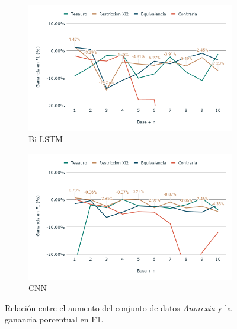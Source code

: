 \begin{figure}[hbt!]
    \begin{subfigure}[b]{0.5\textwidth}
        \includegraphics[width=\textwidth]{sections/figures/bi_LSTMAnox.png}
        \caption{Bi-LSTM}
    \end{subfigure}
    \hfill
    \begin{subfigure}[b]{0.5\textwidth}
        \includegraphics[width=\textwidth]{sections/figures/CNNAnox.png}
        \caption{CNN}
    \end{subfigure}
    \hfill
    
    

    
    \caption{Relación entre el aumento del conjunto de datos \textit{Anorexia} y la ganancia porcentual en F1.}
    \label{fig:aumento_n_anorexia}
\end{figure}
